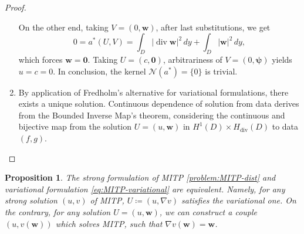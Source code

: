 \documentclass[10pt, a4paper, twoside, openright]{book}
\theoremstyle{definition}
\theoremstyle{plain}
\theoremstyle{plain}
\theoremstyle{plain}
\newtheorem{proposition}[subsection]{Proposition}
\theoremstyle{plain}
\theoremstyle{plain}
\theoremstyle{plain}
\theoremstyle{plain}
\theoremstyle{plain}
\DeclareMathOperator{\divergence}{div}
\begin{document}
\begin{proof}
\begin{enumerate}
 On the other end, taking $V=(0, \bm{w})$, after last substitutions, we get
\begin{equation*}
 0=a^*(U,V)=\int_D|\divergence \bm{w}|^2\,dy + \int_D|\bm{w}|^2\,dy,
\end{equation*}
which forces $\bm{w}=\bm{0}$. Taking $U=(c,\bm 0)$, arbitrariness of $V=(0,\bm \psi)$ yields $u=c=0$. 
In conclusion, the kernel $\mathcal{N}(a^*)=\{0\}$ is trivial.
\item By application of Fredholm's alternative for variational formulations, 
there exists a unique solution.
Continuous dependence of solution from data derives from the Bounded Inverse Map's theorem, considering the continuous and bijective map from the solution $U=(u,\bm w )$ in $H^1(D)\times H_{\divergence}(D)$ to data $(f,g)$.
\end{enumerate}
\end{proof}
\begin{proposition}
\label{prop:MITP-equivalence}
 The strong formulation of MITP \ref{problem:MITP-dist} and variational formulation 
 \eqref{eq:MITP-variational} are equivalent.
 Namely, for any strong solution $(u,v)$ of MITP, $U\coloneqq(u,\nabla v)$ satisfies the variational one. 
 On the contrary, for any solution $U=(u,\bm w)$, we can construct a couple $(u,v({\bm w}))$ 
 which solves MITP, such that $\nabla v(\bm w)=\bm w$.
\end{proposition}
\end{document}
